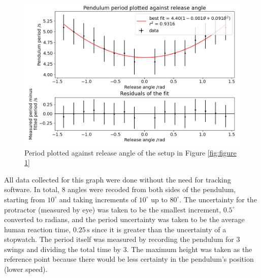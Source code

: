 \documentclass[12pt]{article}
\begin{document}
\begin{figure}[!hptb]
    \centering
    \includegraphics[width=\textwidth]{../figures/period_vs_release_angle.png}
    \caption{\centering Period plotted against release angle of the setup in Figure \ref{fig:figure 1}}
    \label{fig:figure 2}
\end{figure}

All data collected for this graph were done without the need for tracking software. {\color{blue}In total, 8 angles were recoded from both sides of the pendulum, starting from $10^\circ$ and taking increments of $10^\circ$ up to $80^\circ$}. The uncertainty for the protractor (measured by eye) was taken to be the smallest increment, $0.5^{\circ}$ converted to radians, and the period uncertainty was taken to be the average human reaction time, $0.25\,\text{s}$ \cite{reaction-time} {\color{blue} since it is greater than the uncertainty of a stopwatch. The period itself was measured by recording the pendulum for 3 swings and dividing the total time by 3. The maximum height was taken as the reference point because there would be less certainty in the pendulum's position (lower speed).}
\end{document}
